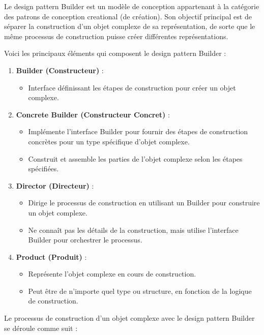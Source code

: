 \documentclass[french]{article}
\begin{document}
Le design pattern Builder est un modèle de conception appartenant à la catégorie des patrons de conception creational (de création). Son objectif principal est de séparer la construction d'un objet complexe de sa représentation, de sorte que le même processus de construction puisse créer différentes représentations.

Voici les principaux éléments qui composent le design pattern Builder :

\begin{enumerate}
    \item \textbf{Builder (Constructeur)} :
    \begin{itemize}
        \item Interface définissant les étapes de construction pour créer un objet complexe.
    \end{itemize}
    
    \item \textbf{Concrete Builder (Constructeur Concret)} :
    \begin{itemize}
        \item Implémente l'interface Builder pour fournir des étapes de construction concrètes pour un type spécifique d'objet complexe.
        \item Construit et assemble les parties de l'objet complexe selon les étapes spécifiées.
    \end{itemize}
    
    \item \textbf{Director (Directeur)} :
    \begin{itemize}
        \item Dirige le processus de construction en utilisant un Builder pour construire un objet complexe.
        \item Ne connaît pas les détails de la construction, mais utilise l'interface Builder pour orchestrer le processus.
    \end{itemize}
    
    \item \textbf{Product (Produit)} :
    \begin{itemize}
        \item Représente l'objet complexe en cours de construction.
        \item Peut être de n'importe quel type ou structure, en fonction de la logique de construction.
    \end{itemize}
\end{enumerate}

Le processus de construction d'un objet complexe avec le design pattern Builder se déroule comme suit :
\end{document}
